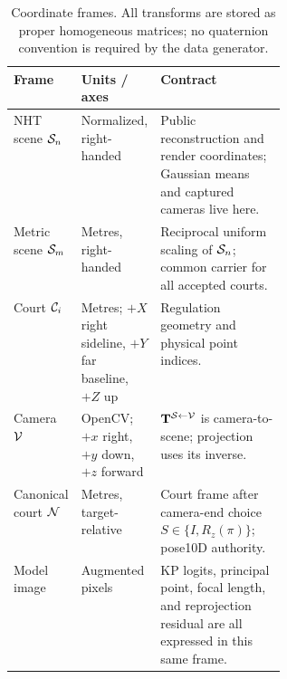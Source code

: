 \begin{table}[t]
  \centering
  \caption{Coordinate frames.  All transforms are stored as proper homogeneous
  matrices; no quaternion convention is required by the data generator.}
  \label{tab:coordinate_contracts}
  \small
  \begin{tabularx}{\linewidth}{@{}p{0.15\linewidth}p{0.20\linewidth}X@{}}
    \toprule
    Frame & Units / axes & Contract \\
    \midrule
    NHT scene \(\mathcal{S}_n\) & Normalized, right-handed & Public reconstruction
      and render coordinates; Gaussian means and captured cameras live here. \\
    Metric scene \(\mathcal{S}_m\) & Metres, right-handed & Reciprocal uniform
      scaling of \(\mathcal{S}_n\); common carrier for all accepted courts. \\
    Court \(\mathcal{C}_i\) & Metres; \(+X\) right sideline, \(+Y\) far baseline,
      \(+Z\) up & Regulation geometry and physical point indices. \\
    Camera \(\mathcal{V}\) & OpenCV; \(+x\) right, \(+y\) down, \(+z\) forward &
      \(\mathbf{T}^{\mathcal{S}\leftarrow \mathcal{V}}\) is camera-to-scene; projection uses its inverse. \\
    Canonical court \(\mathcal{N}\) & Metres, target-relative & Court frame after
      camera-end choice \(S\in\{I,R_z(\pi)\}\); pose10D authority. \\
    Model image & Augmented pixels & KP logits, principal point, focal length,
      and reprojection residual are all expressed in this same frame. \\
    \bottomrule
  \end{tabularx}
\end{table}

